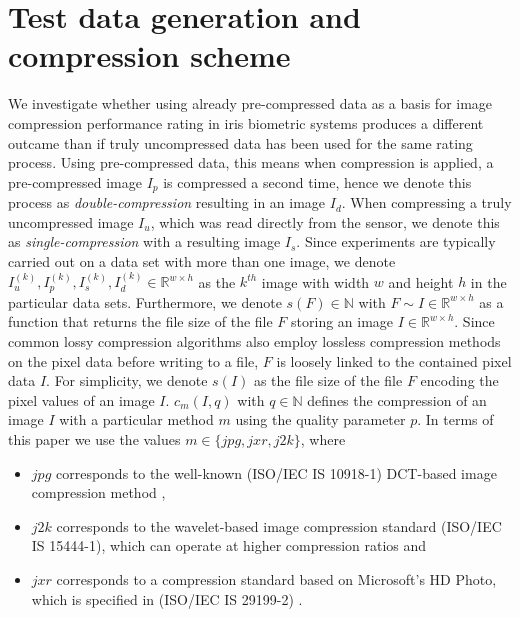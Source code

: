 \documentclass[10pt,twocolumn,letterpaper]{article}
\begin{document}
\section{Test data generation and compression scheme}
\label{section:comprScheme}
We investigate whether using already pre-compressed data as a basis for image compression performance rating in iris biometric systems produces a different outcame than if truly uncompressed data has been used for the same rating process. Using pre-compressed data, this means when compression is applied, a pre-compressed image $I_p$ is compressed a second time, hence we denote this process as \emph{double-compression} resulting in an image $I_d$. When compressing a truly uncompressed image $I_u$, which was read directly from the sensor, we denote this as \emph{single-compression} with a resulting image $I_s$. Since experiments are typically carried out on a data set with more than one image, we denote $I_u^{(k)}, I_p^{(k)}, I_s^{(k)}, I_d^{(k)} \in \mathbb{R}^{w \times h}$ as the $k^{th}$ image with width $w$ and height $h$ in the particular data sets. Furthermore, we denote $s(F) \in \mathbb{N}$ with $F \sim{I \in \mathbb{R}^{w \times h}}$ as a function that returns the file size of the file $F$ storing an image $I \in \mathbb{R}^{w \times h} $. Since common lossy compression algorithms also employ lossless compression methods on the pixel data before writing to a file, $F$ is loosely linked to the contained pixel data $I$. For simplicity, we denote $s(I)$ as the file size of the file $F$ encoding the pixel values of an image $I$. $c_{m}(I, q)$ with $q \in \mathbb{N}$ defines the compression of an image $I$ with a particular method $m$ using the quality parameter $p$. In terms of this paper we use the values $m \in \{jpg, jxr, j2k\}$, where 
\begin{itemize}
	\item $jpg$ corresponds to the well-known (ISO/IEC IS 10918-1) DCT-based image compression method \cite{jpg},
	\item $j2k$ corresponds to the wavelet-based image compression standard (ISO/IEC IS 15444-1), which can operate at higher compression ratios \cite{j2k} and
	\item $jxr$ corresponds to a compression standard based on Microsoft’s HD Photo, which is specified in (ISO/IEC IS 29199-2) \cite{jxr}.  
\end{itemize}

\end{document}
